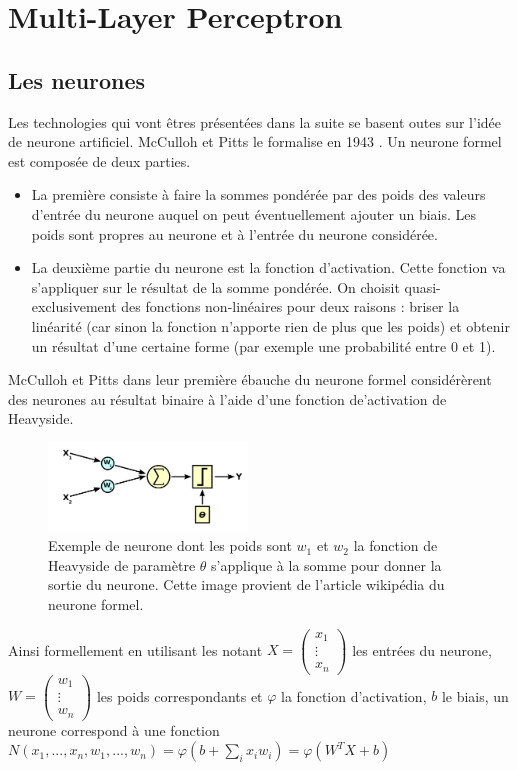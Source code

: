 \chapter{Multi-Layer Perceptron}

\section{Les neurones}

Les technologies qui vont êtres présentées dans la suite se basent outes sur l'idée de neurone artificiel. McCulloh et Pitts le formalise en 1943 \cite{McCullohPitts}.
Un neurone formel est composée de deux parties.\begin{itemize}
\item La première consiste à faire la sommes pondérée par des poids des valeurs d'entrée du neurone auquel on peut éventuellement ajouter un biais. Les poids sont propres au neurone et à l'entrée du neurone considérée.
\item La deuxième partie du neurone est la fonction d'activation. Cette fonction va s'appliquer sur le résultat de la somme pondérée. On choisit quasi-exclusivement des fonctions non-linéaires pour deux raisons : briser la linéarité (car sinon la fonction n'apporte rien de plus que les poids) et obtenir un résultat d'une certaine forme (par exemple une probabilité entre 0 et 1).
\end{itemize}
McCulloh et Pitts dans leur première ébauche du neurone formel considérèrent des neurones au résultat binaire à l'aide d'une fonction de'activation de Heavyside.



\begin{figure}[!h]
\centering
\includegraphics[width=150pt,valign=t]{"images/MLP/neurone_exemple"}
\caption{Exemple de neurone dont les poids sont $w_1$ et $w_2$ la fonction de Heavyside de paramètre $\theta$ s'applique à la somme pour donner la sortie du neurone. Cette image provient de l'article wikipédia du neurone formel.}
\label{neurone_exemple}
\end{figure}

Ainsi formellement en utilisant les notant $X = \begin{pmatrix} x_1\\ \vdots \\ x_n \end{pmatrix}$  les entrées du neurone, $W = \begin{pmatrix} w_1\\ \vdots \\ w_n \end{pmatrix}$ les poids correspondants et $\varphi$ la fonction d'activation, $b$ le biais, un neurone correspond à une fonction $N(x_1,...,x_n,w_1,...,w_n) = \varphi(b+ \sum\limits_{i} x_i w_i) = \varphi(W^T  X+b)$



